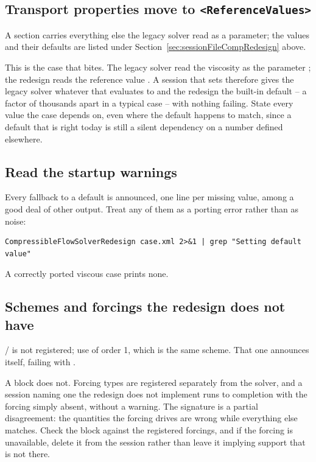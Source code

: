\subsection*{Transport properties move to \texttt{<ReferenceValues>}}
A  section carries everything else the legacy
solver read as a parameter; the values and their defaults are listed under
Section~\ref{sec:sessionFileCompRedesign} above.

This is the case that bites. The legacy solver read the viscosity as the
parameter ; the redesign reads the reference value
. A session that sets 
therefore gives the legacy solver whatever that evaluates to and the
redesign the built-in default -- a factor of thousands apart in a typical
case -- with nothing failing. State every value the case depends on, even
where the default happens to match, since a default that is right today is
still a silent dependency on a number defined elsewhere.

\subsection*{Read the startup warnings}
Every fallback to a default is announced, one line per missing value, among a
good deal of other output. Treat any of them as a porting error rather than as
noise:
\begin{lstlisting}[style=BashInputStyle]
CompressibleFlowSolverRedesign case.xml 2>&1 | grep "Setting default value"
\end{lstlisting}
A correctly ported viscous case prints none.

\subsection*{Schemes and forcings the redesign does not have}
/ is not registered; use  of
order 1, which is the same scheme. That one announces itself, failing with
.

A  block does not. Forcing types are registered separately
from the solver, and a session naming one the redesign does not implement runs
to completion with the forcing simply absent, without a warning. The signature
is a partial disagreement: the quantities the forcing drives are wrong while
everything else matches. Check the block against the registered forcings, and
if the forcing is unavailable, delete it from the session rather than leave it
implying support that is not there.

